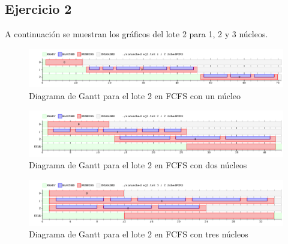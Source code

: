 \subsection{Ejercicio 2}

  A continuaci\'on se muestran los gr\'aficos del lote 2 para 1, 2 y 3 n\'ucleos.
  \begin{figure}[htb]
  \includegraphics[scale=0.32]{images/ej2_1.png}
  \caption{Diagrama de Gantt para el lote 2 en FCFS con un n\'ucleo}
  \end{figure}
  \begin{figure}[htb]
  \includegraphics[scale=0.32]{images/ej2_2.png}
  \caption{Diagrama de Gantt para el lote 2 en FCFS con dos n\'ucleos}
  \end{figure}
  \begin{figure}[htb]
  \includegraphics[scale=0.32]{images/ej2_3.png}
  \caption{Diagrama de Gantt para el lote 2 en FCFS con tres n\'ucleos}
  \end{figure}
